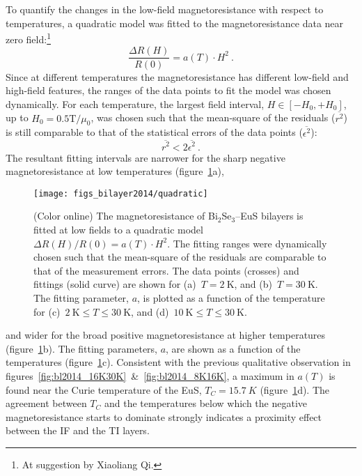 To quantify the changes in the low-field magnetoresistance with respect to temperatures, a quadratic model was fitted to the magnetoresistance data near zero field:\footnote{At suggestion by Xiaoliang Qi.}%
\begin{equation}\label{eq:bl2014_quadratic}%
    \frac{\Delta R(H)}{R(0)} = a(T)\cdot H^2~.%
\end{equation}%
Since at different temperatures the magnetoresistance has different low-field and high-field features, the ranges of the data points to fit the model was chosen dynamically. For each temperature, the largest field interval, $H \in [-H_0, +H_0]$, up to $H_0 = 0.5 \mathrm{T}/\mu_0$, was chosen such that the mean-square of the residuals ($\overline{r^2}$) is still comparable to that of the statistical errors of the data points ($\overline{\epsilon^2}$):
\begin{equation}
    \overline{r^2} < 2\overline{\epsilon^2}~.%
\end{equation}%
The resultant fitting intervals are narrower for the sharp negative magnetoresistance at low temperatures (figure~\ref{fig:bl2014_quadratic}a),%
%
\begin{figure}[ht]%
    \centering%
    \texttt{[image: figs\_bilayer2014/quadratic]}%
    \caption[Quadratic fittings to the magnetoresistance of a Bi$_2$Se$_3$--EuS bilayer]{\label{fig:bl2014_quadratic}(Color online) The magnetoresistance of Bi$_2$Se$_3$--EuS bilayers is fitted at low fields to a quadratic model $\Delta R(H) / R(0) = a(T)\cdot H^2$. The fitting ranges were dynamically chosen such that the mean-square of the residuals are comparable to that of the measurement errors. The data points (crosses) and fittings (solid curve) are shown for (a)~$T=2~\mathrm{K}$, and (b)~$T=30~\mathrm{K}$. The fitting parameter, $a$, is plotted as a function of the temperature for (c)~$2~\mathrm{K} \leq T \leq 30~\mathrm{K}$, and (d)~$10~\mathrm{K} \leq T \leq 30~\mathrm{K}$.}%
\end{figure} %
%
and wider for the broad positive magnetoresistance at higher temperatures (figure~\ref{fig:bl2014_quadratic}b). The fitting parameters, $a$, are shown as a function of the temperatures (figure~\ref{fig:bl2014_quadratic}c). Consistent with the previous qualitative observation in figures~\ref{fig:bl2014_16K30K}~\&~\ref{fig:bl2014_8K16K}, a maximum in $a(T)$ is found near the Curie temperature of the EuS, $T_C = \SI{15.7}{K}$ (figure~\ref{fig:bl2014_quadratic}d). The agreement between $T_C$ and the temperatures below which the negative magnetoresistance starts to dominate strongly indicates a proximity effect between the IF and the TI layers.

